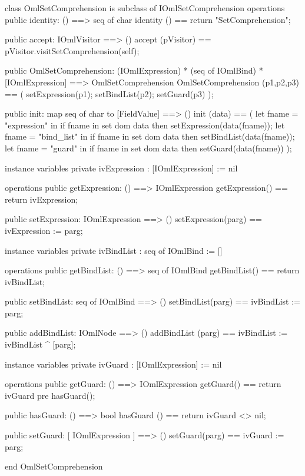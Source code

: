 \begin{vdm_al}
class OmlSetComprehension is subclass of IOmlSetComprehension
operations
  public identity: () ==> seq of char
  identity () == return "SetComprehension";

  public accept: IOmlVisitor ==> ()
  accept (pVisitor) == pVisitor.visitSetComprehension(self);

  public OmlSetComprehension:
      (IOmlExpression) *
      (seq of IOmlBind) *
      [IOmlExpression] ==> OmlSetComprehension
  OmlSetComprehension (p1,p2,p3) == 
   ( setExpression(p1);
     setBindList(p2);
     setGuard(p3) );

  public init: map seq of char to [FieldValue] ==> ()
  init (data) ==
    ( let fname = "expression" in
        if fname in set dom data
        then setExpression(data(fname));
      let fname = "bind_list" in
        if fname in set dom data
        then setBindList(data(fname));
      let fname = "guard" in
        if fname in set dom data
        then setGuard(data(fname)) );

instance variables
  private ivExpression : [IOmlExpression] := nil

operations
  public getExpression: () ==> IOmlExpression
  getExpression() == return ivExpression;

  public setExpression: IOmlExpression ==> ()
  setExpression(parg) == ivExpression := parg;

instance variables
  private ivBindList : seq of IOmlBind := []

operations
  public getBindList: () ==> seq of IOmlBind
  getBindList() == return ivBindList;

  public setBindList: seq of IOmlBind ==> ()
  setBindList(parg) == ivBindList := parg;

  public addBindList: IOmlNode ==> ()
  addBindList (parg) == ivBindList := ivBindList ^ [parg];

instance variables
  private ivGuard : [IOmlExpression] := nil

operations
  public getGuard: () ==> IOmlExpression
  getGuard() == return ivGuard
    pre hasGuard();

  public hasGuard: () ==> bool
  hasGuard () == return ivGuard <> nil;

  public setGuard: [ IOmlExpression ] ==> ()
  setGuard(parg) == ivGuard := parg;

end OmlSetComprehension
\end{vdm_al}

